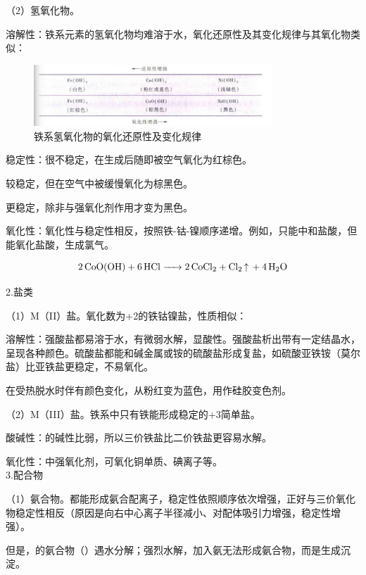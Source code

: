 \documentclass[a4paper,UTF8]{article}
\begin{document}
（2）氢氧化物。

溶解性：铁系元素的氢氧化物均难溶于水，氧化还原性及其变化规律与其氧化物类似：

\begin{figure}[htpb]
	\centering
	\includegraphics[width=0.8\textwidth]{figure//铁系氢氧化物.png}
	\caption{铁系氢氧化物的氧化还原性及变化规律}
	\label{fig:}
\end{figure}

稳定性：很不稳定，在生成后随即被空气氧化为红棕色。

较稳定，但在空气中被缓慢氧化为棕黑色。

更稳定，除非与强氧化剂作用才变为黑色。

氧化性：氧化性与稳定性相反，按照铁-钴-镍顺序递增。例如，只能中和盐酸，但能氧化盐酸，生成氯气。

$$ \ce{2CoO(OH) + 6HCl -> 2CoCl2 + Cl2 ^ + 4H2O} $$

2.盐类

（1）M（II）盐。氧化数为+2的铁钴镍盐，性质相似：

溶解性：强酸盐都易溶于水，有微弱水解，显酸性。强酸盐析出带有一定结晶水，呈现各种颜色。硫酸盐都能和碱金属或铵的硫酸盐形成复盐，如硫酸亚铁铵（莫尔盐）比亚铁盐更稳定，不易氧化。

在受热脱水时伴有颜色变化，从粉红变为蓝色，用作硅胶变色剂。

（2）M（III）盐。铁系中只有铁能形成稳定的+3简单盐。

酸碱性：的碱性比弱，所以三价铁盐比二价铁盐更容易水解。

氧化性：中强氧化剂，可氧化铜单质、碘离子等。\\

3.配合物

（1）氨合物。都能形成氨合配离子，稳定性依照顺序依次增强，正好与三价氧化物稳定性相反（原因是向右中心离子半径减小、对配体吸引力增强，稳定性增强）。

但是，的氨合物（）遇水分解；强烈水解，加入氨无法形成氨合物，而是生成沉淀。
\end{document}
